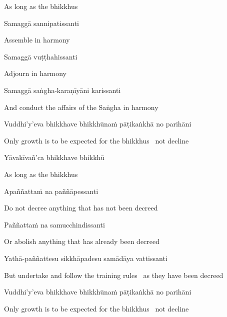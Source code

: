 \begin{english}
  As long as the bhikkhus
\end{english}

Samaggā sannipatissanti

\begin{english}
  Assemble in harmony
\end{english}

Samaggā vuṭṭhahissanti

\begin{english}
  Adjourn in harmony
\end{english}

Samaggā saṅgha-karaṇīyāni karissanti

\begin{english}
  And conduct the affairs of the Saṅgha in harmony
\end{english}

\ifninebythirteenversion\clearpage\fi

Vuddhi'y'eva bhikkhave bhikkhūnaṁ pāṭikaṅkhā no parihāni

\begin{english}
  Only growth is to be expected for the bhikkhus \breathmark\ not decline
\end{english}

Yāvakīvañ'ca bhikkhave bhikkhū

\begin{english}
  As long as the bhikkhus
\end{english}

Apaññattaṁ na paññāpessanti

\begin{english}
  Do not decree anything that has not been decreed
\end{english}

Paññattaṁ na samucchindissanti

\begin{english}
  Or abolish anything that has already been decreed
\end{english}

Yathā-paññattesu sikkhāpadesu samādāya vattissanti

\begin{english-hang}
  But undertake and follow the training rules \breathmark\ as they have been decreed
\end{english-hang}

Vuddhi'y'eva bhikkhave bhikkhūnaṁ pāṭikaṅkhā no parihāni

\begin{english}
  Only growth is to be expected for the bhikkhus \breathmark\ not decline
\end{english}

